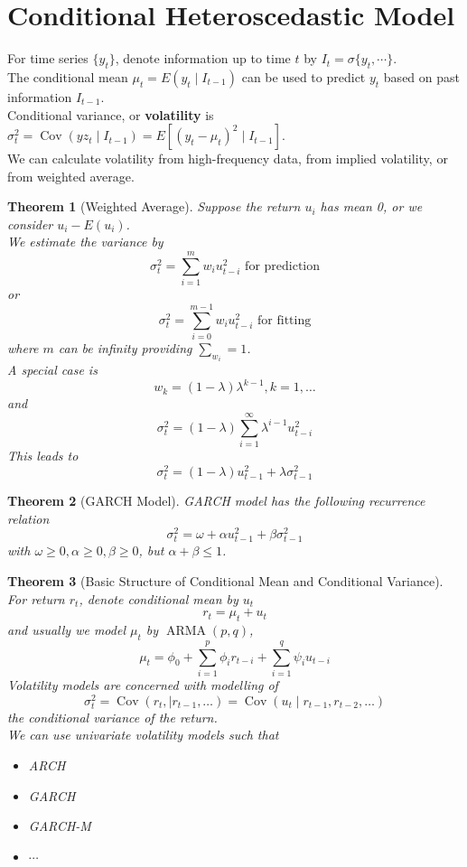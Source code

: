 \documentclass[11pt]{article}
\newtheorem{theorem}{Theorem}[section]
\theoremstyle{definition}
\DeclareMathOperator{\cov}{Cov}
\DeclareMathOperator{\ARMA}{ARMA}
\begin{document}
\section{Conditional Heteroscedastic Model}
For time series $\{y_t\}$, denote information up to time $t$ by $I_t = \sigma\{y_t, \cdots\}$.\\
The conditional mean $\mu_t = E(y_t\mid I_{t-1})$ can be used to predict $y_t$ based on past information $I_{t-1}$.\\
Conditional variance, or \textbf{volatility} is $\sigma^2_t = \cov(yz_t\mid I_{t-1}) = E[(y_t-\mu_t)^2\mid I_{t-1}]$.\\
We can calculate volatility from high-frequency data, from implied volatility, or from weighted average.
\begin{theorem}[Weighted Average]
\normalfont Suppose the return $u_i$ has mean 0, or we consider $u_i-E(u_i)$.\\
We estimate the variance by
\[
\sigma_t^2 = \sum_{i=1}^m w_i u_{t-i}^2\text{ for prediction}
\]
or
\[
\sigma_t^2 = \sum_{i=0}^{m-1}w_i u_{t-i}^2\text{ for fitting}
\]
where $m$ can be infinity providing $\sum_{w_i}=1$.\\
A special case is
\[
w_k = (1-\lambda)\lambda^{k-1}, k = 1,\ldots
\]
and
\[
\sigma_t^2 = (1-\lambda)\sum_{i=1}^\infty \lambda^{i-1}u_{t-i}^2
\]
This leads to 
\[
\sigma_t^2 = (1-\lambda)u_{t-1}^2 + \lambda \sigma_{t-1}^2
\]
\end{theorem}
\begin{theorem}[GARCH Model]
\normalfont GARCH model has the following recurrence relation
\[
\sigma^2_t = \omega + \alpha u_{t-1}^2 + \beta \sigma^2_{t-1}
\]
with $\omega\geq 0, \alpha \geq 0, \beta \geq 0$, but $\alpha+\beta\leq1$.
\end{theorem}
\begin{theorem}[Basic Structure of Conditional Mean and Conditional Variance]
\normalfont For return $r_t$, denote conditional mean by $u_t$
\[
r_t= \mu_t + u_t
\]
and usually we model $\mu_t$ by $\ARMA(p,q)$,
\[
\mu_t = \phi_0 + \sum_{i=1}^p \phi_i r_{t-i} + \sum_{i=1}^q \psi_i u_{t-i}
\]
Volatility models are concerned with modelling of
\[
\sigma_t^2  = \cov(r_t, \mid r_{t-1}, \ldots) = \cov(u_t\mid r_{t-1}, r_{t-2},\ldots)
\]
the conditional variance of the return.\\
We can use univariate volatility models such that
\begin{itemize}
  \item ARCH
  \item GARCH
  \item GARCH-M
  \item $\cdots$
\end{itemize}
\end{theorem}
\end{document}
